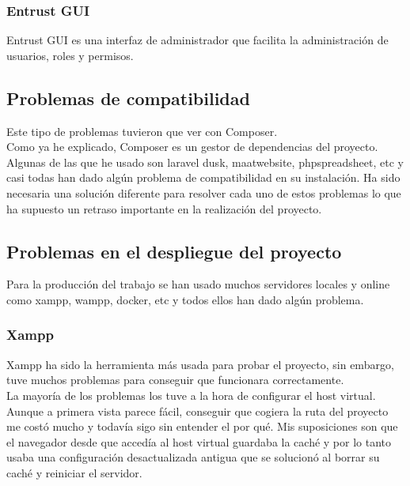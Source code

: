 \subsubsection{Entrust GUI}
Entrust GUI es una interfaz de administrador que facilita la administración de usuarios, roles y permisos.
\subsection{Problemas de compatibilidad}
Este tipo de problemas tuvieron que ver con Composer.\\
Como ya he explicado, Composer es un gestor de dependencias del proyecto. Algunas de las que he usado son laravel dusk, maatwebsite, phpspreadsheet, etc y casi todas han dado algún problema de compatibilidad en su instalación.
Ha sido necesaria una solución diferente para resolver cada uno de estos problemas lo que ha supuesto un retraso importante en la realización del proyecto.
\subsection{Problemas en el despliegue del proyecto}
Para la producción del trabajo se han usado muchos servidores locales y online como xampp, wampp, docker, etc y todos ellos han dado algún problema.\\
\subsubsection{Xampp}
Xampp ha sido la herramienta más usada para probar el proyecto, sin embargo, tuve muchos problemas para conseguir que funcionara correctamente.\\
La mayoría de los problemas los tuve a la hora de configurar el host virtual.
Aunque a primera vista parece fácil, conseguir que cogiera la ruta del proyecto me costó mucho y todavía sigo sin entender el por qué. Mis suposiciones son que el navegador desde que accedía al host virtual guardaba la caché y por lo tanto usaba una configuración desactualizada antigua que se solucionó al borrar su caché y reiniciar el servidor.
